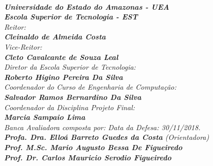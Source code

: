 \begin{spacing}{1.4}
\textit{\textbf{\\
Universidade do Estado do Amazonas - UEA\\
Escola Superior de Tecnologia - EST}}
\textit{\\
Reitor:\\
\textbf{Cleinaldo de Almeida Costa}\\
Vice-Reitor:\\ \textbf{Cleto Cavalcante de Souza Leal}}
\\
\textit{
Diretor da Escola Superior de Tecnologia:\\
\textbf{Roberto Higino Pereira Da Silva}}
\\
\textit{
Coordenador do Curso de Engenharia de Computação:\\
\textbf{Salvador Ramos Bernardino Da Silva}}
\\
\textit{
Coordenador da Disciplina Projeto Final:\\
\textbf{Marcia Sampaio Lima}}
\\[12pt]
\textit{
Banca Avaliadora composta por: \hfill Data da Defesa: 30/11/2018.\\
}
\textit{
\textbf{Profa. Dra. Elloá Barreto Guedes da Costa} (Orientadora)\\
\textbf{Prof. M.Sc. Mario Augusto Bessa De Figueiredo}\\%
\textbf{Prof. Dr. Carlos Mauricio Serodio Figueiredo}
}
\ \ \\
 \begin{small}
\begin{center}
\end{center}
\end{small}
\end{spacing}
 \newpage
